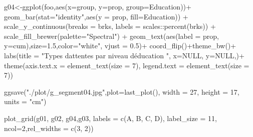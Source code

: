 \documentclass[
]{book}
\newenvironment{Shaded}{\begin{snugshade}}{\end{snugshade}}
\newcommand{\AttributeTok}[1]{\textcolor[rgb]{0.77,0.63,0.00}{#1}}
\newcommand{\ConstantTok}[1]{\textcolor[rgb]{0.00,0.00,0.00}{#1}}
\newcommand{\DecValTok}[1]{\textcolor[rgb]{0.00,0.00,0.81}{#1}}
\newcommand{\FloatTok}[1]{\textcolor[rgb]{0.00,0.00,0.81}{#1}}
\newcommand{\FunctionTok}[1]{\textcolor[rgb]{0.00,0.00,0.00}{#1}}
\newcommand{\NormalTok}[1]{#1}
\newcommand{\OtherTok}[1]{\textcolor[rgb]{0.56,0.35,0.01}{#1}}
\newcommand{\SpecialCharTok}[1]{\textcolor[rgb]{0.00,0.00,0.00}{#1}}
\newcommand{\StringTok}[1]{\textcolor[rgb]{0.31,0.60,0.02}{#1}}
\begin{document}
\begin{Shaded}
\begin{Highlighting}[]
\NormalTok{g04}\OtherTok{\textless{}{-}}\FunctionTok{ggplot}\NormalTok{(foo,}\FunctionTok{aes}\NormalTok{(}\AttributeTok{x=}\NormalTok{group, }\AttributeTok{y=}\NormalTok{prop, }\AttributeTok{group=}\NormalTok{Education))}\SpecialCharTok{+}
  \FunctionTok{geom\_bar}\NormalTok{(}\AttributeTok{stat=}\StringTok{"identity"}\NormalTok{,}\FunctionTok{aes}\NormalTok{(}\AttributeTok{y =}\NormalTok{ prop, }\AttributeTok{fill=}\NormalTok{Education)) }\SpecialCharTok{+} 
 \FunctionTok{scale\_y\_continuous}\NormalTok{(}\AttributeTok{breaks =}\NormalTok{ brks, }\AttributeTok{labels =}\NormalTok{ scales}\SpecialCharTok{::}\FunctionTok{percent}\NormalTok{(brks)) }\SpecialCharTok{+}
  \FunctionTok{scale\_fill\_brewer}\NormalTok{(}\AttributeTok{palette=}\StringTok{"Spectral"}\NormalTok{) }\SpecialCharTok{+} 
  \FunctionTok{geom\_text}\NormalTok{(}\FunctionTok{aes}\NormalTok{(}\AttributeTok{label =}\NormalTok{ prop, }\AttributeTok{y=}\NormalTok{cum),}\AttributeTok{size=}\FloatTok{1.5}\NormalTok{,}\AttributeTok{color=}\StringTok{"white"}\NormalTok{, }\AttributeTok{vjust =} \FloatTok{0.5}\NormalTok{)}\SpecialCharTok{+}
  \FunctionTok{coord\_flip}\NormalTok{()}\SpecialCharTok{+}\FunctionTok{theme\_bw}\NormalTok{()}\SpecialCharTok{+}
  \FunctionTok{labs}\NormalTok{(}\AttributeTok{title =} \StringTok{"Types d\textquotesingle{}attentes par niveau d\textquotesingle{}éducation "}\NormalTok{, }
       \AttributeTok{x=}\ConstantTok{NULL}\NormalTok{, }\AttributeTok{y=}\ConstantTok{NULL}\NormalTok{,)}\SpecialCharTok{+}
  \FunctionTok{theme}\NormalTok{(}\AttributeTok{axis.text.x =} \FunctionTok{element\_text}\NormalTok{(}\AttributeTok{size =} \DecValTok{7}\NormalTok{), }\AttributeTok{legend.text =} \FunctionTok{element\_text}\NormalTok{(}\AttributeTok{size =} \DecValTok{7}\NormalTok{)) }
  


\FunctionTok{ggsave}\NormalTok{(}\StringTok{"./plot/g\_segment04.jpg"}\NormalTok{,}\AttributeTok{plot=}\FunctionTok{last\_plot}\NormalTok{(), }\AttributeTok{width =} \DecValTok{27}\NormalTok{, }\AttributeTok{height =} \DecValTok{17}\NormalTok{, }\AttributeTok{units =} \StringTok{"cm"}\NormalTok{)}


\FunctionTok{plot\_grid}\NormalTok{(g01, g02, g04,g03,  }\AttributeTok{labels =} \FunctionTok{c}\NormalTok{(}\StringTok{\textquotesingle{}A\textquotesingle{}}\NormalTok{, }\StringTok{\textquotesingle{}B\textquotesingle{}}\NormalTok{, }\StringTok{\textquotesingle{}C\textquotesingle{}}\NormalTok{, }\StringTok{\textquotesingle{}D\textquotesingle{}}\NormalTok{), }\AttributeTok{label\_size =} \DecValTok{11}\NormalTok{, }\AttributeTok{ncol=}\DecValTok{2}\NormalTok{,}\AttributeTok{rel\_widths =}  \FunctionTok{c}\NormalTok{(}\DecValTok{3}\NormalTok{, }\DecValTok{2}\NormalTok{))}
\end{Highlighting}
\end{Shaded}
\end{document}
